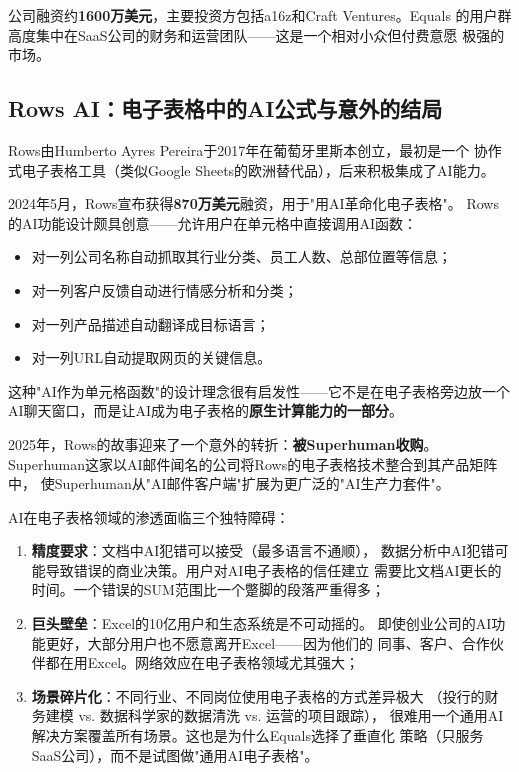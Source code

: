 公司融资约\textbf{1600万美元}，主要投资方包括a16z和Craft Ventures。Equals
的用户群高度集中在SaaS公司的财务和运营团队——这是一个相对小众但付费意愿
极强的市场。

\subsection{Rows AI：电子表格中的AI公式与意外的结局}
\label{subsec:rows-ai}

Rows由Humberto Ayres Pereira于2017年在葡萄牙里斯本创立，最初是一个
协作式电子表格工具（类似Google Sheets的欧洲替代品），后来积极集成了AI能力。

2024年5月，Rows宣布获得\textbf{870万美元}融资，用于"用AI革命化电子表格"。
Rows的AI功能设计颇具创意——允许用户在单元格中直接调用AI函数：

\begin{itemize}
  \item 对一列公司名称自动抓取其行业分类、员工人数、总部位置等信息；
  \item 对一列客户反馈自动进行情感分析和分类；
  \item 对一列产品描述自动翻译成目标语言；
  \item 对一列URL自动提取网页的关键信息。
\end{itemize}

这种"AI作为单元格函数"的设计理念很有启发性——它不是在电子表格旁边放一个
AI聊天窗口，而是让AI成为电子表格的\textbf{原生计算能力的一部分}。

2025年，Rows的故事迎来了一个意外的转折：\textbf{被Superhuman收购}。
Superhuman这家以AI邮件闻名的公司将Rows的电子表格技术整合到其产品矩阵中，
使Superhuman从"AI邮件客户端"扩展为更广泛的"AI生产力套件"。

\begin{corebox}[AI电子表格的结构性挑战]
AI在电子表格领域的渗透面临三个独特障碍：
\begin{enumerate}
  \item \textbf{精度要求}：文档中AI犯错可以接受（最多语言不通顺），
    数据分析中AI犯错可能导致错误的商业决策。用户对AI电子表格的信任建立
    需要比文档AI更长的时间。一个错误的SUM范围比一个蹩脚的段落严重得多；
  \item \textbf{巨头壁垒}：Excel的10亿用户和生态系统是不可动摇的。
    即使创业公司的AI功能更好，大部分用户也不愿意离开Excel——因为他们的
    同事、客户、合作伙伴都在用Excel。网络效应在电子表格领域尤其强大；
  \item \textbf{场景碎片化}：不同行业、不同岗位使用电子表格的方式差异极大
    （投行的财务建模 vs. 数据科学家的数据清洗 vs. 运营的项目跟踪），
    很难用一个通用AI解决方案覆盖所有场景。这也是为什么Equals选择了垂直化
    策略（只服务SaaS公司），而不是试图做"通用AI电子表格"。
\end{enumerate}
\end{corebox}

